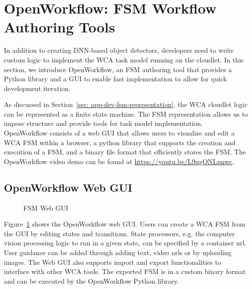 \section{OpenWorkflow: FSM Workflow Authoring Tools}
\label{sec: app-dev-fsm}

In addition to creating DNN-based object detectors, developers need to write
custom logic to implement the WCA task model running on the cloudlet. In this
section, we introduce OpenWorkflow, an FSM authoring tool that provides a Python
library and a GUI to enable fast implementation to allow for quick development
iteration.

As discussed in Section~\ref{sec: app-dev-fsm-representation}, the WCA cloudlet
logic can be represented as a finite state machine. The FSM representation
allows us to impose structure and provide tools for task model implementation.
OpenWorkflow consists of a web GUI that allows users to visualize and
edit a WCA FSM within a browser, a python library that supports the creation and
execution of a FSM, and a binary file format that efficiently stores the FSM.
The OpenWorkflow video demo can be found at \url{https://youtu.be/L9ugONLpnwc}.

\subsection{OpenWorkflow Web GUI}

\begin{figure}
    \centering
	\caption{FSM Web GUI}
    \label{figs:fsm-web-gui}
\end{figure}

Figure~\ref{figs:fsm-web-gui} shows the OpenWorkflow web GUI. Users can create a WCA
FSM from the GUI by editing states and transitions. State processors, e.g. the
computer vision processing logic to run in a given state, can be specified by a
container url. User guidance can be added through adding text, video urls or by
uploading images. The Web GUI also supports import and export functionalities to
interface with other WCA tools. The exported FSM is in a custom binary format
and can be executed by the OpenWorkflow Python library.

